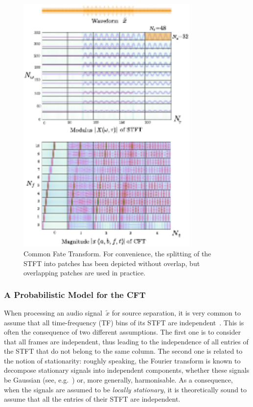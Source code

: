 {{\begin{figure}[t]
\centering
\includegraphics[width=0.8\textwidth]{Chapters/06_Separation_Unknown/figures/CFT}

\caption{Common Fate Transform. For convenience, the splitting of the STFT
into patches has been depicted without overlap, but overlapping patches
are used in practice\label{fig:CFT}.}
\end{figure}

\subsubsection{A Probabilistic Model for the CFT}

\label{ssub:separation}

When processing an audio signal~$\tilde{x}$ for source separation,
it is very common to assume that all time-frequency (TF) bins
of its STFT are independent~\cite{fevotte09, duong10, ozerov12, liutkus11t}.
This is often the consequence of two different assumptions.
The first one is to consider that all frames are independent, thus
leading to the independence of all entries of the STFT that do not belong to the
same column. The second one is related to the notion of stationarity:
roughly speaking, the Fourier transform is known to decompose stationary
signals into independent components, whether these signals be Gaussian
(see, e.g.~\cite{liutkus11t}) or, more generally, harmonisable.
As a consequence, when the signals are assumed to be \emph{locally stationary},
it is theoretically sound to assume that all the entries of
their STFT are independent.

}}
